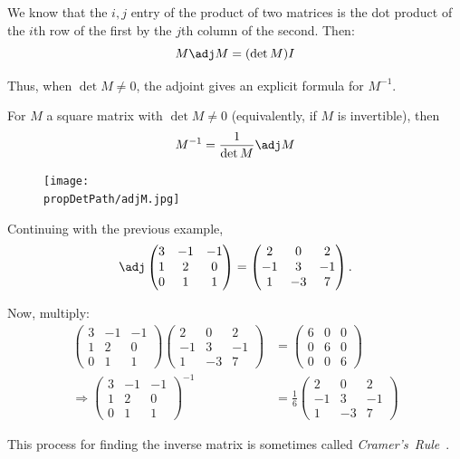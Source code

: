 We know that the $i,j$ entry of the product of two matrices is the dot product of the $i$th row of the first by the $j$th column of the second.  Then:
\[
M\adj M = (\det M) I
\]

Thus, when $\det M\neq 0$, the adjoint gives an explicit formula for $M^{-1}$.


\begin{theorem}
For $M$ a square matrix with $\det M\neq 0$ (equivalently, if $M$ is invertible), then
\[
M^{-1}=\frac{1}{\det M}\adj M
\]
\end{theorem}



\begin{figure}
\begin{center}
\texttt{[image: \\propDetPath/adjM.jpg]}
\end{center}
\end{figure}

\begin{example}
Continuing with the previous example,
\[
\adj \begin{pmatrix}
3 & -1 & -1 \\
1 & 2 & 0 \\
0 & 1 & 1 \\
\end{pmatrix} = \begin{pmatrix}
2 & 0 & 2 \\
-1 & 3 & -1 \\
1 & -3 & 7 \\
\end{pmatrix}.
\]

Now, multiply:
\begin{align*}
\begin{pmatrix}
3 & -1 & -1 \\
1 & 2 & 0 \\
0 & 1 & 1
\end{pmatrix}
\begin{pmatrix}
2 & 0 & 2 \\
-1 & 3 & -1 \\
1 & -3 & 7
\end{pmatrix}
&=
\begin{pmatrix}
6 & 0 & 0 \\
0 & 6 & 0 \\
0 & 0 & 6
\end{pmatrix} \\[1mm]
\Rightarrow \begin{pmatrix}
3 & -1 & -1 \\
1 & 2 & 0 \\
0 & 1 & 1
\end{pmatrix}^{-1}
& = \frac{1}{6}\begin{pmatrix}
2 & 0 & 2 \\
-1 & 3 & -1 \\
1 & -3 & 7
\end{pmatrix}
\end{align*}

This process for finding the inverse matrix is sometimes called \emph{Cramer's~Rule}~.
\end{example}

